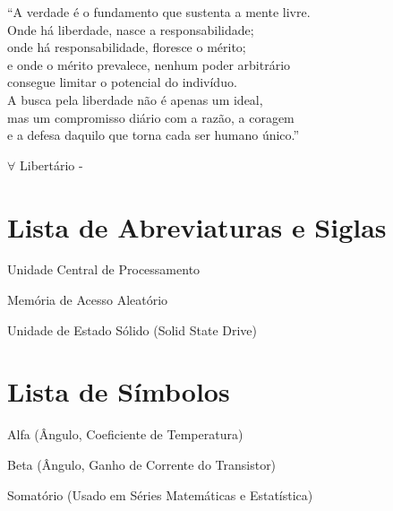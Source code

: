 \documentclass[a4paper,12pt,brazilian,oneside]{Relatorio}
\begin{document}
\begin{epigrafe}
    ``A verdade é o fundamento que sustenta a mente livre.\\
    Onde há liberdade, nasce a responsabilidade;\\
    onde há responsabilidade, floresce o mérito;\\
    e onde o mérito prevalece, nenhum poder arbitrário\\
    consegue limitar o potencial do indivíduo.\\
    A busca pela liberdade não é apenas um ideal,\\
    mas um compromisso diário com a razão, a coragem\\
    e a defesa daquilo que torna cada ser humano único.''
    
    $\forall$ Libertário - \WenesTex
\end{epigrafe}









\listoffigures
\listoftables

\chapter*{Lista de Abreviaturas e Siglas}
\begin{siglas}
    \item[CPU] Unidade Central de Processamento
    \item[RAM] Memória de Acesso Aleatório
    \item[SSD] Unidade de Estado Sólido (Solid State Drive)
\end{siglas}

\chapter*{Lista de Símbolos}
\begin{simbolos}
    \item[$\alpha$] Alfa (Ângulo, Coeficiente de Temperatura)
    \item[$\beta$] Beta (Ângulo, Ganho de Corrente do Transistor)
    \item[$\sum$] Somatório (Usado em Séries Matemáticas e Estatística)
\end{simbolos}
\end{document}
